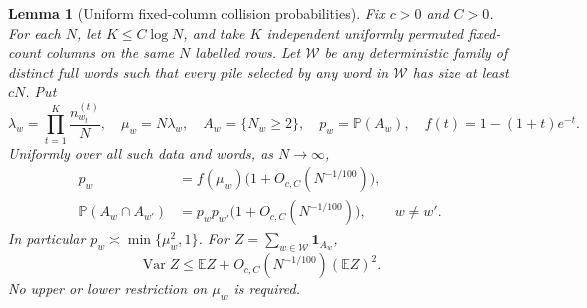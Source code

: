 \documentclass[11pt]{article}
\numberwithin{equation}{section}
\newtheorem{lemma}[theorem]{Lemma}
\theoremstyle{definition}
\theoremstyle{remark}
\newcommand{\E}{\mathbb E}
\newcommand{\Pp}{\mathbb P}
\newcommand{\Var}{\operatorname{Var}}
\newcommand{\1}{\mathbf 1}
\begin{document}
\begin{lemma}[Uniform fixed-column collision probabilities]
\label{lem:two-category-poisson}
Fix $c>0$ and $C>0$. For each $N$, let $K\le C\log N$, and take $K$
independent uniformly permuted fixed-count columns on the same $N$ labelled
rows. Let $\mathcal W$ be any deterministic family of distinct full words
such that every pile selected by any word in $\mathcal W$ has size at least
$cN$. Put
\[
 \lambda_w=\prod_{t=1}^{K}\frac{n_{w_t}^{(t)}}N,
 \quad \mu_w=N\lambda_w,
 \quad A_w=\{N_w\ge2\},\quad p_w=\Pp(A_w),
 \quad f(t)=1-(1+t)e^{-t}.
\]
Uniformly over all such data and words, as $N\to\infty$,
\begin{align}
 p_w&=f(\mu_w)\bigl(1+O_{c,C}(N^{-1/100})\bigr),
 \label{eq:uniform-collision-marginal}\\
 \Pp(A_w\cap A_{w'})
 &=p_wp_{w'}\bigl(1+O_{c,C}(N^{-1/100})\bigr),\qquad w\ne w'.
 \label{eq:uniform-collision-pair}
\end{align}
In particular $p_w\asymp\min\{\mu_w^2,1\}$. For
$Z=\sum_{w\in\mathcal W}\mathbf 1_{A_w}$,
\begin{equation}
\label{eq:uniform-collision-variance}
 \Var Z\le\E Z+O_{c,C}(N^{-1/100})(\E Z)^2.
\end{equation}
No upper or lower restriction on $\mu_w$ is required.
\end{lemma}
\end{document}
